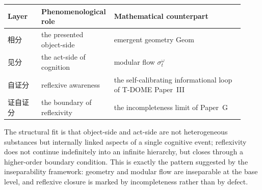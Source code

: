 \documentclass[12pt]{article}
\theoremstyle{definition}
\theoremstyle{remark}
\newcounter{none}
\begin{document}
{\def\LTcaptype{none}
\begin{longtable}{P{0.14\linewidth}P{0.24\linewidth}P{0.54\linewidth}}
\toprule\noalign{}
Layer & Phenomenological role & Mathematical counterpart \\
\midrule\noalign{}
\endhead
\bottomrule\noalign{}
\endlastfoot
相分 & the presented object-side & emergent geometry
\(\mathrm{Geom}\) \\
见分 & the act-side of cognition & modular flow \(\sigma_t^\omega\) \\
自证分 & reflexive awareness & the self-calibrating informational loop
of T-DOME Paper~III~\cite{Liu2026TDOME_III} \\
证自证分 & the boundary of reflexivity & the incompleteness limit of
Paper~G~\cite{Liu2026PaperG} \\
\end{longtable}
}

The structural fit is that object-side and act-side are not heterogeneous
substances but internally linked aspects of a single cognitive event;
reflexivity does not continue indefinitely into an infinite hierarchy,
but closes through a higher-order boundary condition. This is exactly
the pattern suggested by the inseparability framework: geometry and
modular flow are inseparable at the base level, and reflexive closure is
marked by incompleteness rather than by defect.
 
\newpage
%
\end{document}
